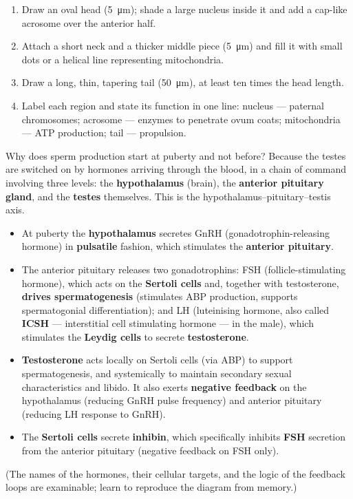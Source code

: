 \documentclass[11pt]{article}
\newcommand{\cle}[1]{{\popxbold\color{popdark}#1}}
\newcounter{popsec}
\newcounter{popsub}
\newcommand{\courssub}[1]{%
  \stepcounter{popsub}%
  \par\vspace{9pt}\noindent{\popxbold\fontsize{11.5}{13}\selectfont\color{popink}{\color{poporange}\thepopsec.\thepopsub}\hspace{6pt}#1}\par\nopagebreak\vspace{4pt}
}
\begin{document}
\begin{methode}
\begin{enumerate}
\item Draw an oval head (\SI{5}{\micro\meter}); shade a large nucleus inside it and add a cap-like acrosome over the anterior half.
\item Attach a short neck and a thicker middle piece (\SI{5}{\micro\meter}) and fill it with small dots or a helical line representing mitochondria.
\item Draw a long, thin, tapering tail (\SI{50}{\micro\meter}), at least ten times the head length.
\item Label each region and state its function in one line: nucleus — paternal chromosomes; acrosome — enzymes to penetrate ovum coats; mitochondria — ATP production; tail — propulsion.
\end{enumerate}
\end{methode}

\courssub{Hormonal Control of the Testes}

Why does sperm production start at puberty and not before? Because the testes are switched on by hormones arriving through the blood, in a chain of command involving three levels: the \textbf{hypothalamus} (brain), the \textbf{anterior pituitary gland}, and the \textbf{testes} themselves. This is the \cle{hypothalamus–pituitary–testis axis}.

\begin{propriete}
\begin{itemize}
\item At puberty the \textbf{hypothalamus} secretes \cle{GnRH} (gonadotrophin-releasing hormone) in \textbf{pulsatile} fashion, which stimulates the \textbf{anterior pituitary}.
\item The anterior pituitary releases two gonadotrophins: \cle{FSH} (follicle-stimulating hormone), which acts on the \textbf{Sertoli cells} and, together with testosterone, \textbf{drives spermatogenesis} (stimulates ABP production, supports spermatogonial differentiation); and \cle{LH} (luteinising hormone, also called \textbf{ICSH} — interstitial cell stimulating hormone — in the male), which stimulates the \textbf{Leydig cells} to secrete \textbf{testosterone}.
\item \textbf{Testosterone} acts locally on Sertoli cells (via ABP) to support spermatogenesis, and systemically to maintain secondary sexual characteristics and libido. It also exerts \textbf{negative feedback} on the hypothalamus (reducing GnRH pulse frequency) and anterior pituitary (reducing LH response to GnRH).
\item The \textbf{Sertoli cells} secrete \textbf{inhibin}, which specifically inhibits \textbf{FSH} secretion from the anterior pituitary (negative feedback on FSH only).
\end{itemize}
(The names of the hormones, their cellular targets, and the logic of the feedback loops are examinable; learn to reproduce the diagram from memory.)
\end{propriete}
\end{document}
